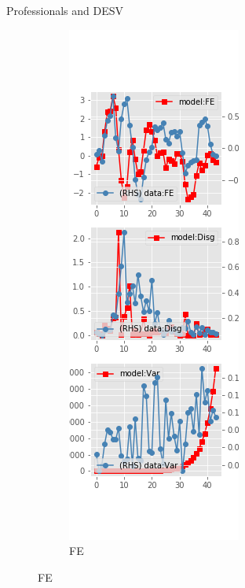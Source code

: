 \documentclass{beamer}
\begin{document}
\begin{frame}{Professionals and DESV}
	\begin{figure}[ht]
		\label{DESV_diag_SPF}
		\begin{subfigure}[b]{0.2\textwidth}
			\centering
			\caption{FE}
			\includegraphics[width=\textwidth, height = 0.8\textheight]{figuresDraft/spf_de_est_sv_diag0.png}

\end{subfigure}
\end{figure}
\end{frame}
\end{document}

